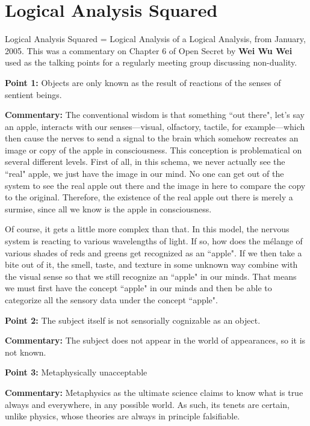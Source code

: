 \section{Logical Analysis Squared}

\begin{quotex}
Logical Analysis Squared = Logical Analysis of a Logical Analysis, from January, 2005. This was a commentary on Chapter 6 of Open Secret by \textbf{Wei Wu Wei} used as the talking points for a regularly meeting group discussing non-duality. 
\end{quotex}

\textbf{Point 1:} Objects are only known as the result of reactions of the senses of sentient beings.

\textbf{Commentary:} The conventional wisdom is that something ``out there", let's say an apple, interacts with our senses—visual, olfactory, tactile, for example—which then cause the nerves to send a signal to the brain which somehow recreates an image or copy of the apple in consciousness. This conception is problematical on several different levels. First of all, in this schema, we never actually see the ``real" apple, we just have the image in our mind. No one can get out of the system to see the real apple out there and the image in here to compare the copy to the original. Therefore, the existence of the real apple out there is merely a surmise, since all we know is the apple in consciousness.

Of course, it gets a little more complex than that. In this model, the nervous system is reacting to various wavelengths of light. If so, how does the mélange of various shades of reds and greens get recognized as an ``apple". If we then take a bite out of it, the smell, taste, and texture in some unknown way combine with the visual sense so that we still recognize an ``apple" in our minds. That means we must first have the concept ``apple" in our minds and then be able to categorize all the sensory data under the concept ``apple".

\textbf{Point 2:} The subject itself is not sensorially cognizable as an object.

\textbf{Commentary:} The subject does not appear in the world of appearances, so it is not known.

\textbf{Point 3:} Metaphysically unacceptable

\textbf{Commentary:} Metaphysics as the ultimate science claims to know what is true always and everywhere, in any possible world. As such, its tenets are certain, unlike physics, whose theories are always in principle falsifiable.

